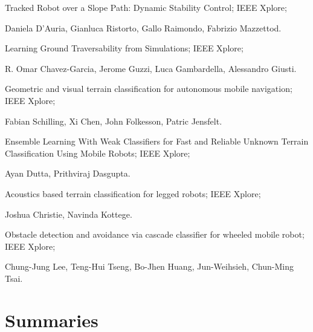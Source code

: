 \documentclass{romjist}
\begin{document}
Tracked Robot over a Slope Path: Dynamic Stability Control; IEEE Xplore;\par\noindent Daniela D'Auria, Gianluca Ristorto, Gallo Raimondo, Fabrizio Mazzettod.\par
Learning Ground Traversability from Simulations; IEEE Xplore;\par\noindent R. Omar Chavez-Garcia, Jerome Guzzi, Luca Gambardella, Alessandro Giusti.\par
Geometric and visual terrain classification for autonomous mobile navigation; IEEE Xplore;\par\noindent Fabian Schilling, Xi Chen, John Folkesson, Patric Jensfelt.\par
Ensemble Learning With Weak Classifiers for Fast and Reliable Unknown Terrain Classification Using Mobile Robots; IEEE Xplore;\par\noindent Ayan Dutta, Prithviraj Dasgupta.\par
Acoustics based terrain classification for legged robots; IEEE Xplore;\par\noindent Joshua Christie, Navinda Kottege.\par
Obstacle detection and avoidance via cascade classifier for wheeled mobile robot; IEEE Xplore;\par\noindent Chung-Jung Lee, Teng-Hui Tseng, Bo-Jhen Huang, Jun-Weihsieh, Chun-Ming Tsai.



\section{Summaries}
\end{document}
